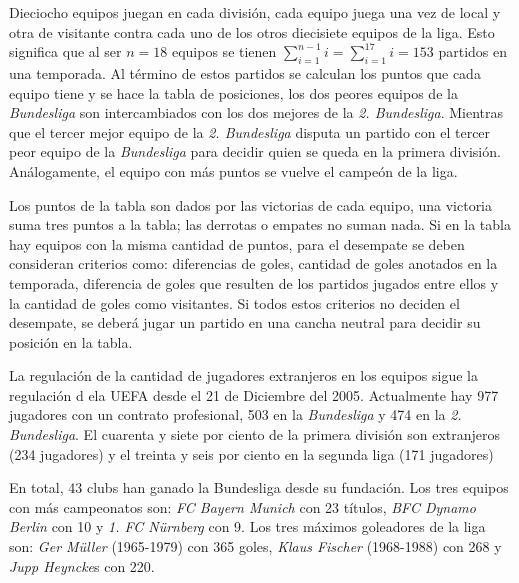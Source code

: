 Dieciocho equipos juegan en cada división, cada equipo juega una vez de local y otra de visitante contra cada uno de los otros diecisiete equipos de la liga. Esto significa que al ser $n=18$ equipos se tienen $\sum\limits_{i=1}^{n-1} i= \sum\limits_{i=1}^{17} i= 153 $ partidos en una temporada. Al término de estos partidos se calculan los puntos que cada equipo tiene y se hace la tabla de posiciones, los dos peores equipos de la \emph{Bundesliga} son intercambiados con los dos mejores de la \emph{2. Bundesliga}. Mientras que el tercer mejor equipo de la \emph{2. Bundesliga} disputa un partido con el tercer peor equipo de la \emph{Bundesliga} para decidir quien se queda en la primera división. Análogamente, el equipo con más puntos se vuelve el campeón de la liga.

Los puntos de la tabla son dados por las victorias de cada equipo, una victoria suma tres puntos a la tabla; las derrotas o empates no suman nada. Si en la tabla hay equipos con la misma cantidad de puntos, para el desempate se deben consideran criterios como: diferencias de goles, cantidad de goles anotados en la temporada,  diferencia de goles que resulten de los partidos jugados entre ellos y la cantidad de goles como visitantes. Si todos estos criterios no deciden el desempate, se deberá jugar un partido en una cancha neutral para decidir su posición en la tabla.

La regulación de la cantidad de jugadores extranjeros en los equipos sigue la regulación d ela UEFA desde el 21 de Diciembre del 2005. Actualmente hay 977 jugadores con un contrato profesional, 503 en la \emph{Bundesliga} y 474 en la \emph{2. Bundesliga}. El cuarenta y siete por ciento de la primera división son extranjeros (234 jugadores) y el treinta y seis por ciento  en la segunda liga (171 jugadores)

En total, 43 clubs han ganado la Bundesliga desde su fundación. Los tres equipos con más campeonatos son: \emph{FC Bayern Munich} con 23 títulos, \emph{BFC Dynamo Berlin} con 10 y \emph{1. FC Nürnberg} con 9. Los tres máximos goleadores de la liga son: \emph{Ger Müller} (1965-1979) con 365 goles, \emph{Klaus Fischer} (1968-1988) con 268 y \emph{Jupp Heyncke}s con 220. \cite{bundesliga}


